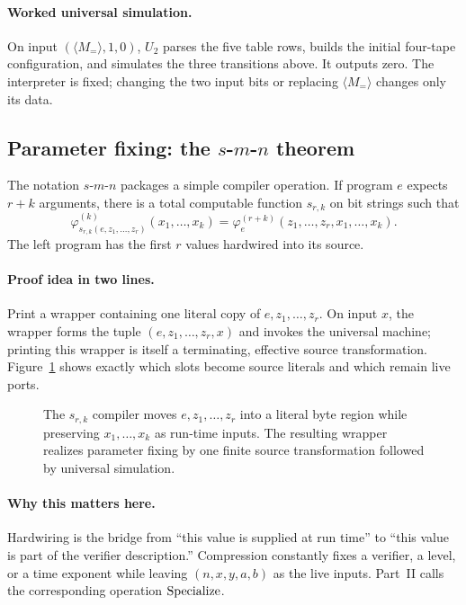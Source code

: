 \paragraph{Worked universal simulation.}
On input \((\langle M_=\rangle,1,0)\), \(U_2\) parses the five table rows,
builds the initial four-tape configuration, and simulates the three transitions
above.  It outputs zero.  The interpreter is fixed; changing the two input
bits or replacing \(\langle M_=\rangle\) changes only its data.

\subsection{Parameter fixing: the
\texorpdfstring{\(s\)-\(m\)-\(n\)}{s-m-n} theorem}

The notation \(s\)-\(m\)-\(n\) packages a simple compiler operation.  If
program \(e\) expects \(r+k\) arguments, there is a total computable function
\(s_{r,k}\) on bit strings such that
\[
 \varphi^{(k)}_{s_{r,k}(e,z_1,\ldots,z_r)}(x_1,\ldots,x_k)
 =\varphi^{(r+k)}_e(z_1,\ldots,z_r,x_1,\ldots,x_k).
\]
The left program has the first \(r\) values hardwired into its source.

\paragraph{Proof idea in two lines.}
Print a wrapper containing one literal copy of \(e,z_1,\ldots,z_r\).  On input
\(x\), the wrapper forms the tuple
\((e,z_1,\ldots,z_r,x)\) and invokes the universal machine; printing this
wrapper is itself a terminating, effective source transformation.
Figure~\ref{fig:smn} shows exactly which slots become source literals and
which remain live ports.

\begin{figure}[t]
\centering

\caption{The \(s_{r,k}\) compiler moves \(e,z_1,\ldots,z_r\) into a literal byte region while preserving \(x_1,\ldots,x_k\) as run-time inputs.  The resulting wrapper realizes parameter fixing by one finite source transformation followed by universal simulation.}
\label{fig:smn}
\end{figure}

\paragraph{Why this matters here.}
Hardwiring is the bridge from ``this value is supplied at run time'' to ``this
value is part of the verifier description.''  Compression constantly fixes a
verifier, a level, or a time exponent while leaving \((n,x,y,a,b)\) as the
live inputs.  Part~II calls the corresponding operation \(\operatorname{Specialize}\).

